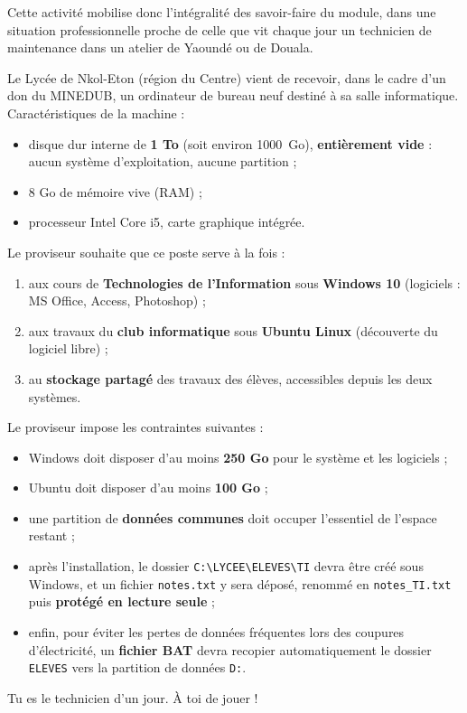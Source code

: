 \documentclass[11pt]{article}
\newcounter{popsec}
\newcounter{popsub}
\newcommand{\courssub}[1]{%
  \stepcounter{popsub}%
  \par\vspace{9pt}\noindent{\popxbold\fontsize{11.5}{13}\selectfont\color{popink}{\color{poporange}\thepopsec.\thepopsub}\hspace{6pt}#1}\par\nopagebreak\vspace{4pt}
}
\begin{document}
Cette activité mobilise donc l'intégralité des savoir-faire du module, dans une situation professionnelle proche de celle que vit chaque jour un technicien de maintenance dans un atelier de Yaoundé ou de Douala.

\courssub{Situation}

\begin{exemplebox}
Le Lycée de Nkol-Eton (région du Centre) vient de recevoir, dans le cadre d'un don du MINEDUB, un ordinateur de bureau neuf destiné à sa salle informatique. Caractéristiques de la machine :

\begin{itemize}
  \item disque dur interne de \textbf{1 To} (soit environ \SI{1000}{Go}), \textbf{entièrement vide} : aucun système d'exploitation, aucune partition ;
  \item 8 Go de mémoire vive (RAM) ;
  \item processeur Intel Core i5, carte graphique intégrée.
\end{itemize}

Le proviseur souhaite que ce poste serve à la fois :

\begin{enumerate}
  \item aux cours de \textbf{Technologies de l'Information} sous \textbf{Windows 10} (logiciels : MS Office, Access, Photoshop) ;
  \item aux travaux du \textbf{club informatique} sous \textbf{Ubuntu Linux} (découverte du logiciel libre) ;
  \item au \textbf{stockage partagé} des travaux des élèves, accessibles depuis les deux systèmes.
\end{enumerate}

Le proviseur impose les contraintes suivantes :

\begin{itemize}
  \item Windows doit disposer d'au moins \textbf{250 Go} pour le système et les logiciels ;
  \item Ubuntu doit disposer d'au moins \textbf{100 Go} ;
  \item une partition de \textbf{données communes} doit occuper l'essentiel de l'espace restant ;
  \item après l'installation, le dossier \texttt{C:\textbackslash LYCEE\textbackslash ELEVES\textbackslash TI} devra être créé sous Windows, et un fichier \texttt{notes.txt} y sera déposé, renommé en \texttt{notes\_TI.txt} puis \textbf{protégé en lecture seule} ;
  \item enfin, pour éviter les pertes de données fréquentes lors des coupures d'électricité, un \textbf{fichier BAT} devra recopier automatiquement le dossier \texttt{ELEVES} vers la partition de données \texttt{D:}.
\end{itemize}

Tu es le technicien d'un jour. À toi de jouer !
\end{exemplebox}
\end{document}
